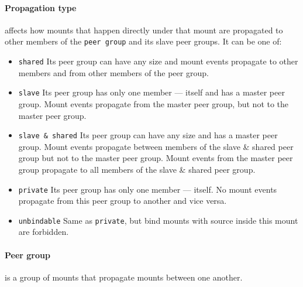 \documentclass[en]{pracamgr}
\begin{document}
\paragraph{Propagation type} affects how mounts that happen directly under that mount are propagated to other members of the \texttt{peer group} and its slave peer groups. It can be one of:
\begin{itemize}
    \item \texttt{shared} Its peer group can have any size and mount events propagate to other members and from other members of the peer group.
    \item \texttt{slave} Its peer group has only one member --- itself and has a master peer group. Mount events propagate from the master peer group, but not to the master peer group.
    \item \texttt{slave \& shared} Its peer group can have any size and has a master peer group. Mount events propagate between members of the slave \& shared peer group but not to the master peer group. Mount events from the master peer group propagate to all members of the slave \& shared peer group.
    \item \texttt{private} Its peer group has only one member --- itself. No mount events propagate from this peer group to another and vice versa.
    \item \texttt{unbindable} Same as \texttt{private}, but bind mounts with source inside this mount are forbidden.
\end{itemize}

\paragraph{Peer group} is a group of mounts that propagate mounts between one another.
\end{document}
